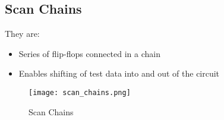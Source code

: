 \documentclass[12pt]{report}
\begin{document}
\subsection{Scan Chains}
 They are:
\begin{itemize}
    \item Series of flip-flops connected in a chain
    \item Enables shifting of test data into and out of the circuit
\end{itemize}
\begin{figure}[H]
    \centering
    \texttt{[image: scan\_chains.png]}
    \caption{Scan Chains}
\end{figure}
\end{document}
